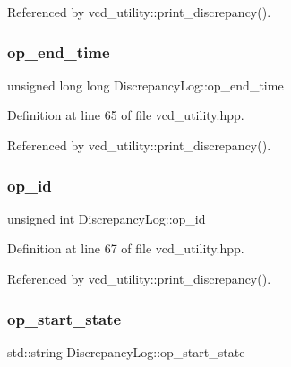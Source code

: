 Referenced by vcd\+\_\+utility\+::print\+\_\+discrepancy().

\mbox{\label{structDiscrepancyLog_ab1fe07a76e338c6390fca37925845108}} 
\subsubsection{\texorpdfstring{op\+\_\+end\+\_\+time}{op\_end\_time}}
{\footnotesize\ttfamily unsigned long long Discrepancy\+Log\+::op\+\_\+end\+\_\+time}



Definition at line 65 of file vcd\+\_\+utility.\+hpp.



Referenced by vcd\+\_\+utility\+::print\+\_\+discrepancy().

\mbox{\label{structDiscrepancyLog_a511a73331084c98d262755f797763029}} 
\subsubsection{\texorpdfstring{op\+\_\+id}{op\_id}}
{\footnotesize\ttfamily unsigned int Discrepancy\+Log\+::op\+\_\+id}



Definition at line 67 of file vcd\+\_\+utility.\+hpp.



Referenced by vcd\+\_\+utility\+::print\+\_\+discrepancy().

\mbox{\label{structDiscrepancyLog_a007a430ee2cbc198fe8c4323d7cdc368}} 
\subsubsection{\texorpdfstring{op\+\_\+start\+\_\+state}{op\_start\_state}}
{\footnotesize\ttfamily std\+::string Discrepancy\+Log\+::op\+\_\+start\+\_\+state}



